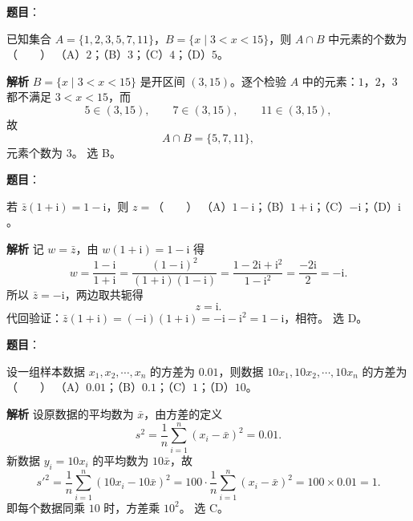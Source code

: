 

\begin{answer}

\textbf{题目}：

已知集合 $A=\{1,2,3,5,7,11\}$，$B=\{x\mid 3<x<15\}$，则 $A\cap B$ 中元素的个数为\mbox{（　　）}
（A）$2$；（B）$3$；（C）$4$；（D）$5$。

\textbf{解析}
$B=\{x\mid 3<x<15\}$ 是开区间 $(3,15)$。逐个检验 $A$ 中的元素：$1$，$2$，$3$ 都不满足 $3<x<15$，而
\nopagebreak[4]
\[5\in(3,15),\qquad 7\in(3,15),\qquad 11\in(3,15),\]
故
\nopagebreak[4]
\[A\cap B=\{5,7,11\},\]
元素个数为 $3$。
选 B。


\end{answer}
\begin{answer}

\textbf{题目}：

若 $\bar z(1+\mathrm i)=1-\mathrm i$，则 $z=$\mbox{（　　）}
（A）$1-\mathrm i$；（B）$1+\mathrm i$；（C）$-\mathrm i$；（D）$\mathrm i$。

\textbf{解析}
记 $w=\bar z$，由 $w(1+\mathrm i)=1-\mathrm i$ 得
\nopagebreak[4]
\[w=\frac{1-\mathrm i}{1+\mathrm i}=\frac{(1-\mathrm i)^2}{(1+\mathrm i)(1-\mathrm i)}=\frac{1-2\mathrm i+\mathrm i^2}{1-\mathrm i^2}=\frac{-2\mathrm i}{2}=-\mathrm i .\]
所以 $\bar z=-\mathrm i$，两边取共轭得
\nopagebreak[4]
\[z=\mathrm i .\]
代回验证：$\bar z(1+\mathrm i)=(-\mathrm i)(1+\mathrm i)=-\mathrm i-\mathrm i^2=1-\mathrm i$，相符。
选 D。


\end{answer}
\begin{answer}

\textbf{题目}：

设一组样本数据 $x_1,x_2,\cdots,x_n$ 的方差为 $0.01$，则数据 $10x_1,10x_2,\cdots,10x_n$ 的方差为\mbox{（　　）}
（A）$0.01$；（B）$0.1$；（C）$1$；（D）$10$。

\textbf{解析}
设原数据的平均数为 $\bar x$，由方差的定义
\nopagebreak[4]
\[s^2=\frac1n\sum_{i=1}^n(x_i-\bar x)^2=0.01 .\]
新数据 $y_i=10x_i$ 的平均数为 $10\bar x$，故
\nopagebreak[4]
\[s'^2=\frac1n\sum_{i=1}^n(10x_i-10\bar x)^2=100\cdot\frac1n\sum_{i=1}^n(x_i-\bar x)^2=100\times0.01=1 .\]
即每个数据同乘 $10$ 时，方差乘 $10^2$。
选 C。


\end{answer}
